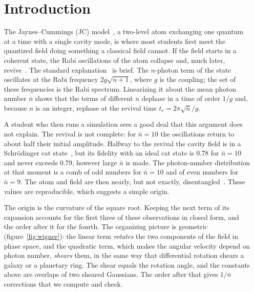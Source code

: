 \documentclass{iopjournal}
\newcommand{\nbar}{\bar{n}}
\begin{document}
\section{Introduction}
\label{sec:intro}

The Jaynes--Cummings (JC) model~\cite{jaynes1963}, a two-level atom exchanging one quantum at a time with a single cavity mode, is where most students first meet the quantized field doing something a classical field cannot. If the field starts in a coherent state, the Rabi oscillations of the atom collapse and, much later, revive~\cite{eberly1980}. The standard explanation~\cite{gerry2004, haroche2006} is brief. The $n$-photon term of the state oscillates at the Rabi frequency $2g\sqrt{n+1}$, where $g$ is the coupling; the set of these frequencies is the Rabi spectrum. Linearizing it about the mean photon number $\nbar$ shows that the terms of different $n$ dephase in a time of order $1/g$ and, because $n$ is an integer, rephase at the revival time $t_r = 2\pi\sqrt{\nbar}/g$.

A student who then runs a simulation sees a good deal that this argument does not explain. The revival is not complete: for $\nbar = 10$ the oscillations return to about half their initial amplitude. Halfway to the revival the cavity field is in a Schr\"{o}dinger cat state~\cite{gea-banacloche1990, gea-banacloche1991, buzek1992}, but its fidelity with an ideal cat state is 0.78 for $\nbar = 10$ and never exceeds 0.79, however large $\nbar$ is made. The photon-number distribution at that moment is a comb of odd numbers for $\nbar = 10$ and of even numbers for $\nbar = 9$. The atom and field are then nearly, but not exactly, disentangled~\cite{gea-banacloche1990, phoenix1991}. These values are reproducible, which suggests a simple origin.

The origin is the curvature of the square root. Keeping the next term of its expansion accounts for the first three of these observations in closed form, and the order after it for the fourth. The organizing picture is geometric (figure~\ref{fig:wigner}): the linear term \emph{rotates} the two components of the field in phase space, and the quadratic term, which makes the angular velocity depend on photon number, \emph{shears} them, in the same way that differential rotation shears a galaxy or a planetary ring. The shear equals the rotation angle, and the constants above are overlaps of two sheared Gaussians. The order after that gives $1/\nbar$ corrections that we compute and check.
\end{document}
